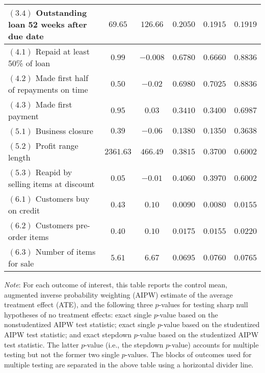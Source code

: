 \begin{table}[!ht]
\begin{center}
\begin{tabular}{l|cc|ccc}
 $ (3.4) $ Outstanding loan 52 weeks after due date & $ 69.65 $  & $ 126.66 $  & $ 0.2050 $ & $ 0.1915 $ & $ 0.1919 $\\
\hline
 $ (4.1) $ Repaid at least 50\% of loan & $ 0.99 $  & $ -0.008 $  & $ 0.6780 $ & $ 0.6660 $ & $ 0.8836 $\\
 $ (4.2) $ Made first half of repayments on time & $ 0.50 $  & $ -0.02 $  & $ 0.6980 $ & $ 0.7025 $ & $ 0.8836 $\\
 $ (4.3) $ Made first payment & $ 0.95 $  & $ 0.03 $  & $ 0.3410 $ & $ 0.3400 $ & $ 0.6987 $\\
\hline
 $ (5.1) $ Business closure & $ 0.39 $  & $ -0.06 $  & $ 0.1380 $ & $ 0.1350 $ & $ 0.3638 $\\
 $ (5.2) $ Profit range length & $ 2361.63 $  & $ 466.49 $  & $ 0.3815 $ & $ 0.3700 $ & $ 0.6002 $\\
 $ (5.3) $ Reapid by selling items at discount & $ 0.05 $  & $ -0.01 $  & $ 0.4060 $ & $ 0.3970 $ & $ 0.6002 $\\
\hline
 $ (6.1) $ Customers buy on credit & $ 0.43 $  & $ 0.10 $  & $  \mathbf { 0.0090 }  $ & $  \mathbf { 0.0080 }  $ & $  \mathbf { 0.0155 }  $\\
 $ (6.2) $ Customers pre-order items & $ 0.40 $  & $ 0.10 $  & $  \mathbf { 0.0175 }  $ & $  \mathbf { 0.0155 }  $ & $  \mathbf { 0.0220 }  $\\
 $ (6.3) $ Number of items for sale & $ 5.61 $  & $ 6.67 $  & $  \mathbf { 0.0695 }  $ & $  \mathbf { 0.0760 }  $ & $  \mathbf { 0.0765 }  $\\
\hline
\hline
\end{tabular}
\end{center} \vspace{-2mm}
\noindent \scriptsize
\textit{Note}: For each outcome of interest, this table reports the control mean, augmented inverse probability weighting (AIPW) estimate of the average treatment effect (ATE), and the following three $ p$-values for testing sharp null hypotheses of no treatment effects: exact single $ p$-value based on the nonstudentized AIPW test statistic; exact single $ p$-value based on the studentized AIPW test statistic; and exact stepdown $ p$-value based on the studentized AIPW test statistic. The latter $ p$-value (i.e., the stepdown $ p$-value) accounts for multiple testing but not the former two single $ p$-values. The blocks of outcomes used for multiple testing are separated in the above table using a horizontal divider line.
\end{table}
